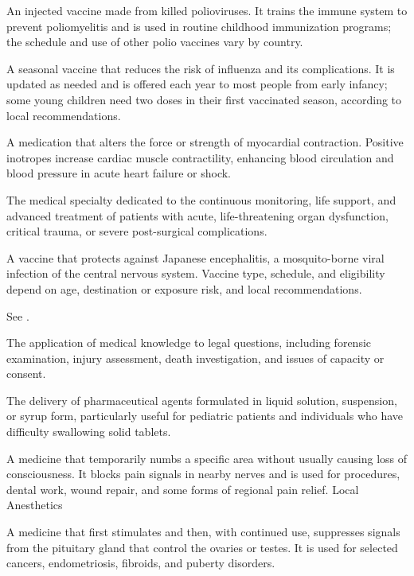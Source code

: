  An injected vaccine made from killed polioviruses. It trains the immune system to prevent poliomyelitis and is used in routine childhood immunization programs; the schedule and use of other polio vaccines vary by country.

 A seasonal vaccine that reduces the risk of influenza and its complications. It is updated as needed and is offered each year to most people from early infancy; some young children need two doses in their first vaccinated season, according to local recommendations.

 A medication that alters the force or strength of myocardial contraction. Positive inotropes increase cardiac muscle contractility, enhancing blood circulation and blood pressure in acute heart failure or shock.


 The medical specialty dedicated to the continuous monitoring, life support, and advanced treatment of patients with acute, life-threatening organ dysfunction, critical trauma, or severe post-surgical complications.

 A vaccine that protects against Japanese encephalitis, a mosquito-borne viral infection of
the central nervous system. Vaccine type, schedule, and eligibility depend on age,
destination or exposure risk, and local recommendations.

 See .

 The application of medical knowledge to legal questions, including forensic examination, injury assessment, death investigation, and issues of capacity or consent.


 The delivery of pharmaceutical agents formulated in liquid solution, suspension, or syrup form, particularly useful for pediatric patients and individuals who have difficulty swallowing solid tablets.

 A medicine that temporarily numbs a specific area without usually causing loss of consciousness. It blocks pain signals in nearby nerves and is used for procedures, dental work, wound repair, and some forms of regional pain relief.
\synonyms
Local Anesthetics

 A medicine that first stimulates and then, with continued use, suppresses signals from the pituitary gland that control the ovaries or testes. It is used for selected cancers, endometriosis, fibroids, and puberty disorders.

